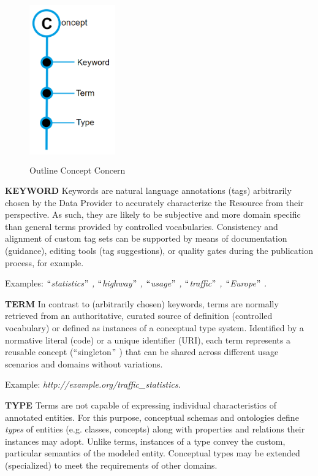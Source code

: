 \begin{figure}[H] 			
	\begin{Center}
		\includegraphics[width=1.46in,height=2.77in]{./media/image38.png}
		\caption{Outline Concept Concern}
		\label{fig:outline_concept_concern}
	\end{Center}
\end{figure}

\textbf{KEYWORD} Keywords are natural language annotations (tags) arbitrarily chosen by the Data Provider to accurately characterize the Resource from their perspective. As such, they are likely to be subjective and more domain specific than general terms provided by controlled vocabularies. Consistency and alignment of custom tag sets can be supported by means of documentation (guidance), editing tools (tag suggestions), or quality gates during the publication process, for example. 

Examples: \textit{$``$statistics$"$ , $``$highway$"$ , $``$usage$"$ , $``$traffic$"$ , $``$Europe$"$ .}

\textbf{TERM} In contrast to (arbitrarily chosen) keywords, terms are normally retrieved from an authoritative, curated source of definition (controlled vocabulary) or defined as instances of a conceptual type system. Identified by a normative literal (code) or a unique identifier (URI), each term represents a reusable concept ($``$singleton$"$ ) that can be shared across different usage scenarios and domains without variations. 

Example: \textit{http://example.org/traffic\_statistics}. 

\textbf{TYPE} Terms are not capable of expressing individual characteristics of annotated entities. For this purpose, conceptual schemas and ontologies define \textit{types} of entities (e.g. classes, concepts) along with properties and relations their instances may adopt. Unlike terms, instances of a type convey the custom, particular semantics of the modeled entity. Conceptual types may be extended (specialized) to meet the requirements of other domains. 

